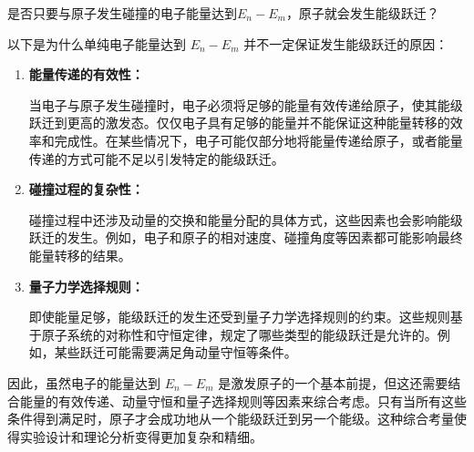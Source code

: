 \documentclass[dvipsnames, svgnames,a4paper,11pt]{article}
\begin{document}
	\begin{question}
		是否只要与原子发生碰撞的电子能量达到\( E_n - E_m \)，原子就会发生能级跃迁？
	\end{question}
	以下是为什么单纯电子能量达到 \( E_n - E_m \) 并不一定保证发生能级跃迁的原因：	
	\begin{enumerate}
		\item \textbf{能量传递的有效性：}
		
		当电子与原子发生碰撞时，电子必须将足够的能量有效传递给原子，使其能级跃迁到更高的激发态。仅仅电子具有足够的能量并不能保证这种能量转移的效率和完成性。在某些情况下，电子可能仅部分地将能量传递给原子，或者能量传递的方式可能不足以引发特定的能级跃迁。
		
		\item \textbf{碰撞过程的复杂性：}
		
		碰撞过程中还涉及动量的交换和能量分配的具体方式，这些因素也会影响能级跃迁的发生。例如，电子和原子的相对速度、碰撞角度等因素都可能影响最终能量转移的结果。
		
		\item \textbf{量子力学选择规则：}
		
		即使能量足够，能级跃迁的发生还受到量子力学选择规则的约束。这些规则基于原子系统的对称性和守恒定律，规定了哪些类型的能级跃迁是允许的。例如，某些跃迁可能需要满足角动量守恒等条件。
	\end{enumerate}	
	
	因此，虽然电子的能量达到 \( E_n - E_m \) 是激发原子的一个基本前提，但这还需要结合能量的有效传递、动量守恒和量子选择规则等因素来综合考虑。只有当所有这些条件得到满足时，原子才会成功地从一个能级跃迁到另一个能级。这种综合考量使得实验设计和理论分析变得更加复杂和精细。
	
\end{document}
